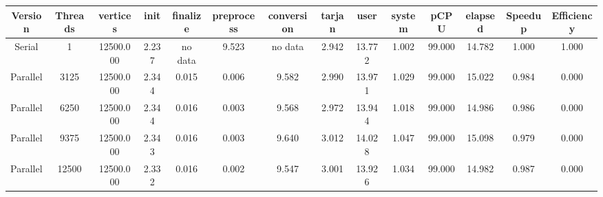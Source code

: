 \begin{tabular}{|c|c|c|c|c|c|c|c|c|c|c|c|c|c|}
\toprule
 Version &  Threads &  vertices &  init & finalize &  preprocess & conversion &  tarjan &   user &  system &   pCPU &  elapsed &  Speedup &  Efficiency \\
\midrule
  Serial &        1 & 12500.000 & 2.237 &  no data &       9.523 &    no data &   2.942 & 13.772 &   1.002 & 99.000 &   14.782 &    1.000 &       1.000 \\
Parallel &     3125 & 12500.000 & 2.344 &    0.015 &       0.006 &      9.582 &   2.990 & 13.971 &   1.029 & 99.000 &   15.022 &    0.984 &       0.000 \\
Parallel &     6250 & 12500.000 & 2.344 &    0.016 &       0.003 &      9.568 &   2.972 & 13.944 &   1.018 & 99.000 &   14.986 &    0.986 &       0.000 \\
Parallel &     9375 & 12500.000 & 2.343 &    0.016 &       0.003 &      9.640 &   3.012 & 14.028 &   1.047 & 99.000 &   15.098 &    0.979 &       0.000 \\
Parallel &    12500 & 12500.000 & 2.332 &    0.016 &       0.002 &      9.547 &   3.001 & 13.926 &   1.034 & 99.000 &   14.982 &    0.987 &       0.000 \\
\bottomrule
\end{tabular}
